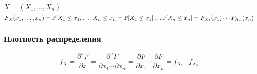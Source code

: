 \(X = (X_1, \ldots, X_n)\)
\[F_X(x_1, \ldots, x_n) = \mathbb P[ X_1\leq x_1, \ldots, X_n\leq x_n = \mathbb P [X_1\leq x_1]\ldots\mathbb P [X_n\leq x_n] = F_{X_1}(x_1) \cdots F_{X_n}(x_n)\]

\subsubsection{Плотность
распределения}\label{ux43fux43bux43eux442ux43dux43eux441ux442ux44c-ux440ux430ux441ux43fux440ux435ux434ux435ux43bux435ux43dux438ux44f}

\[f_X = \frac{\partial^n F}{\partial x} =
        \frac{\partial^n F}{\partial x_1 \cdots \partial x_n} = 
        \frac{\partial F}{\partial x_1} \cdots \frac{\partial F}{\partial x_n} =
        f_{X_1} \cdots f_{X_n} \]
